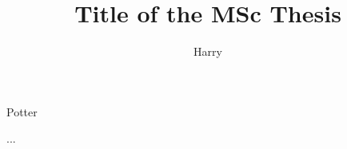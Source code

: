 



\usepackage[labelfont=bf]{caption}
\setlength{\columnsep}{0.7cm}


\raggedbottom %


\title[Subtitle]{Title of the MSc Thesis}
\author{Harry}{Potter}

\frontmatter




\printnomenclature
\listoffigures
\listoftables
\tableofcontents

\mainmatter
\thumbtrue


...

\printbibliography[
heading=bibintoc,
title={Bibliography}
]

\appendix


